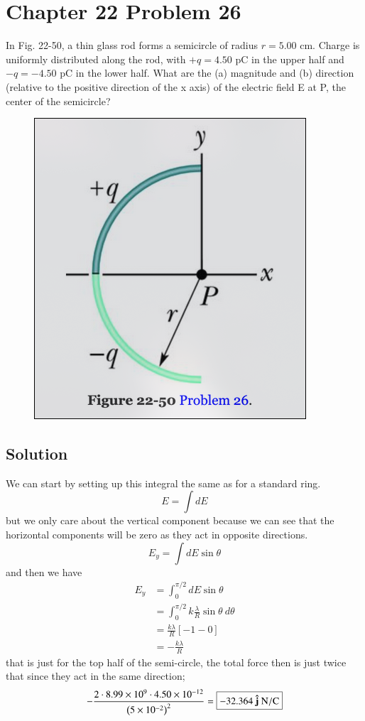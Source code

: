 \documentclass{article}
\newcommand{\N}{\text{N}}
\newcommand{\C}{\text{C}}
\begin{document}
\section*{Chapter 22 Problem 26}
In Fig. 22-50, a thin glass rod forms a semicircle of radius $r = 5.00$ cm.
Charge is uniformly distributed along the rod, with $+q = 4.50$ pC in the upper half and $-q = -4.50$ pC in the lower half. 
What are the (a) magnitude and (b) direction (relative to the positive direction of the x axis) of the electric field E at P, the center of the semicircle?

\begin{figure}[ht]
    \centering
    \includegraphics[scale=0.4]{image-6.png}
\end{figure}

\subsection*{Solution}
We can start by setting up this integral the same as for a standard ring.
\[
	E = \int dE
\]
but we only care about the vertical component because we can see that the horizontal components will be zero as they act in opposite directions.
\[
	E_y = \int dE \sin \theta
\]
and then we have
\begin{align*}
	E_y &= \int_0^{\pi/2} dE \sin \theta\\
	  &= \int_0^{\pi/2} k \frac{\lambda}{R} \sin \theta \ d\theta \\
	  &= \frac{k\lambda}{R} \left[-1 - 0\right] \\
	  &= -\frac{k\lambda}{R}
\end{align*}
that is just for the top half of the semi-circle, the total force then is just twice that since they act in the same direction;
\[
	-\frac{2\cdot 8.99\times10^9 \cdot 4.50 \times 10^{-12}}{\left(5 \times 10^{-2}\right)^2} = \boxed{-32.364\ \vu j \ \N/\C}
\]
\end{document}

